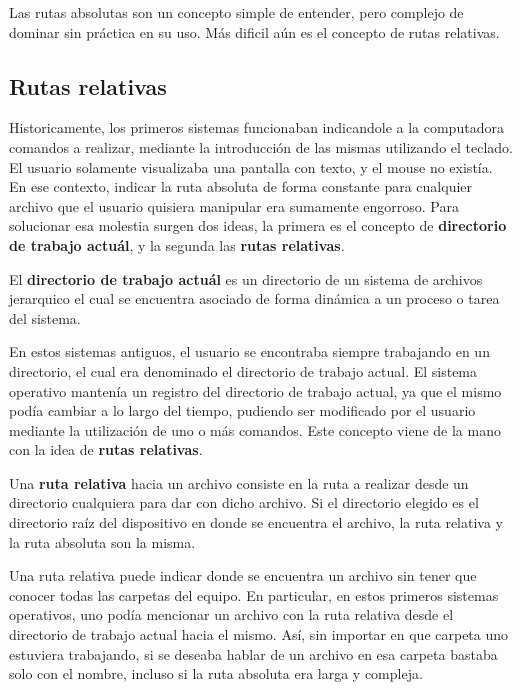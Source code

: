 Las rutas absolutas son un concepto simple de entender, pero complejo de dominar
sin práctica en su uso. Más dificil aún es el concepto de rutas relativas.

\subsection{Rutas relativas}

Historicamente, los primeros sistemas funcionaban indicandole a la computadora
comandos a realizar, mediante la introducción de las mismas utilizando el teclado.
El usuario solamente visualizaba una pantalla con texto, y el mouse no existía.
En ese contexto, indicar la ruta absoluta de forma constante para cualquier archivo
que el usuario quisiera manipular era sumamente engorroso. Para solucionar esa
molestia surgen dos ideas, la primera es el concepto de \textbf{directorio de
trabajo actuál}, y la segunda las \textbf{rutas relativas}.

\begin{definition}
    El \textbf{directorio de trabajo actuál} es un directorio de un sistema de
    archivos jerarquico el cual se encuentra asociado de forma dinámica a un
    proceso o tarea del sistema.
\end{definition}

En estos sistemas antiguos, el usuario se encontraba siempre trabajando en un
directorio, el cual era denominado el directorio de trabajo actual. El sistema
operativo mantenía un registro del directorio de trabajo actual, ya que el mismo
podía cambiar a lo largo del tiempo, pudiendo ser modificado por el usuario
mediante la utilización de uno o más comandos. Este concepto viene de la mano
con la idea de \textbf{rutas relativas}.

\begin{definition}
    Una \textbf{ruta relativa} hacia un archivo consiste en la ruta a realizar
    desde un directorio cualquiera para dar con dicho archivo. Si el directorio
    elegido es el directorio raíz del dispositivo en donde se encuentra el archivo,
    la ruta relativa y la ruta absoluta son la misma.\autocite[vid.]{foldoc_relative_2018}
\end{definition}

Una ruta relativa puede indicar donde se encuentra un archivo sin tener que
conocer todas las carpetas del equipo. En particular, en estos primeros sistemas
operativos, uno podía mencionar un archivo con la ruta relativa desde el
directorio de trabajo actual hacia el mismo. Así, sin importar en que carpeta uno
estuviera trabajando, si se deseaba hablar de un archivo en esa carpeta bastaba
solo con el nombre, incluso si la ruta absoluta era larga y compleja.

